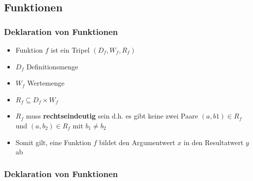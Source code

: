 \subsection{Funktionen}
\begin{frame}
\frametitle{Deklaration von Funktionen}
\begin{block}{\vspace*{-3ex}}
\begin{itemize}
  \item Funktion $f$ ist ein Tripel $(D_f, W_f, R_f)$
  \item $D_f$ Definitionsmenge
  \item $W_f$ Wertemenge
  \item $R_f \subseteq D_f \times W_f$
  \item $R_f$ muss \textbf{rechtseindeutig} sein d.h. es gibt keine zwei Paare $(a,b1) \in R_f$ und $(a,b_2) \in R_f$ mit $b_1 \neq b_2$
  \item Somit gilt, eine Funktion $f$ bildet den Argumentwert $x$ in den Resultatwert $y$ ab 
\end{itemize}
\end{block}
\end{frame}

\begin{frame}
\frametitle{Deklaration von Funktionen}
\end{frame}

